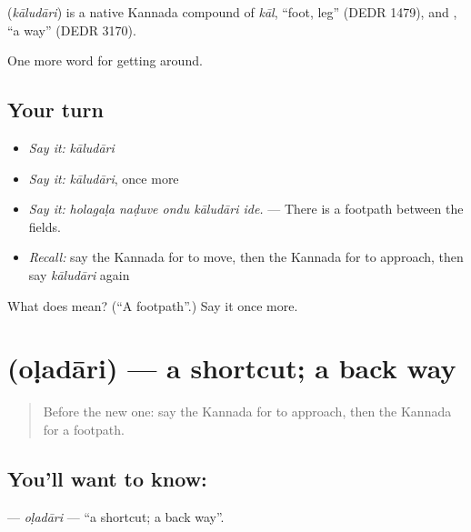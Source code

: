 \begin{cousinweb}
\textbf{} (\emph{kāludāri}) is a native Kannada compound of \emph{kāl}, \textquotedblleft{}foot, leg\textquotedblright{} (DEDR 1479), and , \textquotedblleft{}a way\textquotedblright{} (DEDR 3170).
\end{cousinweb}

\begin{grammarlens}[title={What you've built}]
One more word for getting around.
\end{grammarlens}

\subsection*{Your turn}
\begin{itemize}
\raggedright
  \item \emph{Say it:} \emph{kāludāri}
  \item \emph{Say it:} \emph{kāludāri}, once more
  \item \emph{Say it:} \emph{holagaḷa naḍuve ondu kāludāri ide.} — There is a footpath between the fields.
  \item \emph{Recall:} say the Kannada for to move, then the Kannada for to approach, then say \emph{kāludāri} again
\end{itemize}

\begin{tcolorbox}[breakable,colback=teal!4,colframe=teal!35!black,title={Before you move on}]
What does  mean? (\textquotedblleft{}A footpath\textquotedblright{}.) Say it once more.
\end{tcolorbox}
\section[\texorpdfstring{\kn{ಒಳದಾರಿ} (oḷadāri)}{ಒಳದಾರಿ (oḷadāri)}]{ (oḷadāri) — a shortcut; a back way}

\label{lesson:KA-C446-oladari}



\begin{quote}
Before the new one: say the Kannada for to approach, then the Kannada for a footpath.
\end{quote}

\subsection*{You'll want to know: }
\textbf{} — \emph{oḷadāri} — \textquotedblleft{}a shortcut; a back way\textquotedblright{}.

